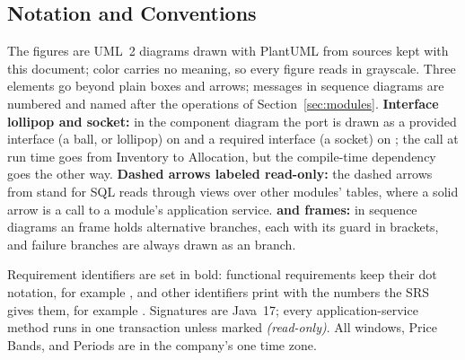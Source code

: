\subsection{Notation and Conventions}

The figures are UML~2 diagrams drawn with PlantUML from sources kept with this document; color carries no meaning, so every figure reads in grayscale. Three elements go beyond plain boxes and arrows; messages in sequence diagrams are numbered and named after the operations of Section~\ref{sec:modules}. \textbf{Interface lollipop and socket:} in the component diagram the port  is drawn as a provided interface (a ball, or lollipop) on  and a required interface (a socket) on ; the call at run time goes from Inventory to Allocation, but the compile-time dependency goes the other way. \textbf{Dashed arrows labeled read-only:} the dashed arrows from  stand for SQL reads through views over other modules' tables, where a solid arrow is a call to a module's application service. \textbf{ and  frames:} in sequence diagrams an  frame holds alternative branches, each with its guard in brackets, and failure branches are always drawn as an  branch.

Requirement identifiers are set in bold: functional requirements keep their dot notation, for example , and other identifiers print with the numbers the SRS gives them, for example . Signatures are Java~17; every application-service method runs in one transaction unless marked \emph{(read-only)}. All windows, Price Bands, and Periods are in the company's one time zone.
